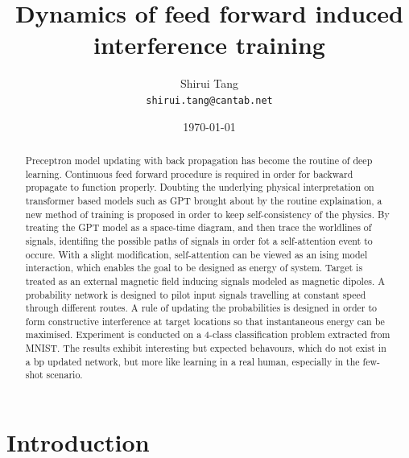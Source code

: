 \documentclass[11pt,a4paper]{article}
\author{Shirui Tang \\
{\tt shirui.tang@cantab.net}}
\title{Dynamics of feed forward induced interference training}
\date{\today}
\begin{document}
\maketitle


\begin{abstract}
  \noindent Preceptron model updating with back propagation has become the routine of deep learning. Continuous feed forward procedure is required in order for backward propagate to function properly.
  Doubting the underlying physical interpretation on transformer based models such as GPT brought about by the routine explaination, a new method of training is proposed in order to keep self-consistency of the physics.
  By treating the GPT model as a space-time diagram, and then trace the worldlines of signals, identifing the possible paths of signals in order fot a self-attention event to occure. With a slight modification, self-attention can be viewed as an ising model interaction, 
  which enables the goal to be designed as energy of system. Target is treated as an external magnetic field inducing signals modeled as magnetic dipoles. A probability network is designed to pilot input signals travelling at constant speed through different routes. 
  A rule of updating the probabilities is designed in order to form constructive interference at target locations so that instantaneous energy can be maximised. 
  Experiment is conducted on a 4-class classification problem extracted from MNIST. The results exhibit interesting but expected behavours, which do not exist in a bp updated network, but more like learning in a real human, especially in the few-shot scenario. 
\end{abstract}

\section{Introduction}
\end{document}

